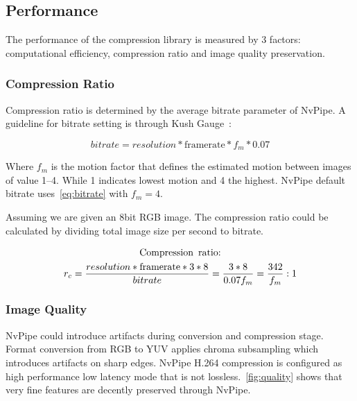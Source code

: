 \documentclass[review]{vgtc}                 %
\begin{document}
\subsection{Performance}

The performance of the compression library is measured by 3 factors: computational efficiency, compression ratio and image quality preservation.

\subsubsection{Compression Ratio}

Compression ratio is determined by the average bitrate parameter of NvPipe. A guideline for bitrate setting is through Kush Gauge~\cite{iszaidyinvestigation}:

\begin{equation}
\label{eq:bitrate}
 bitrate = resolution * \text{framerate} * f_m * 0.07 
\end{equation}

Where \(f_m\) is the motion factor that defines the estimated motion between images of value \numrange{1}{4}. While 1 indicates lowest motion and 4 the highest. NvPipe default bitrate uses~\cref{eq:bitrate} with \(f_m=4\).

Assuming we are given an 8bit RGB image. The compression ratio could be calculated by dividing total image size per second to bitrate.

\begin{multline}
\label{eq:compress_ratio}
 \text{Compression\, ratio:} \\
 r_c = \frac{ resolution * \text{framerate} * 3 * 8}{ bitrate} = \frac{3*8}{0.07f_m} = \frac{342}{f_m} : 1
\end{multline}

\subsubsection{Image Quality}

NvPipe could introduce artifacts during conversion and compression stage. Format conversion from RGB to YUV applies chroma subsampling which introduces artifacts on sharp edges. NvPipe H.264 compression is configured as high performance low latency mode that is not lossless.~\cref{fig:quality} shows that very fine features are decently preserved through NvPipe.
\end{document}
